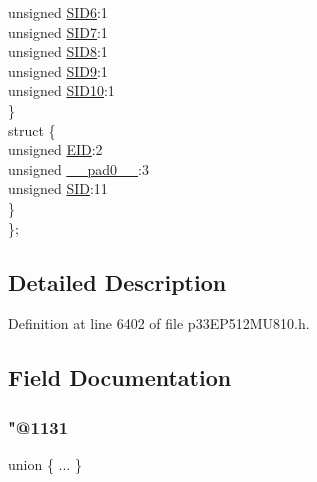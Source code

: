 \begin{DoxyCompactItemize}
\begin{tabbing}
\>\>unsigned \hyperlink{structtag_c2_r_x_f4_s_i_d_b_i_t_s_a70d70952133eb2389d5c326f9f0e8035}{SID6}:1\\
\>\>unsigned \hyperlink{structtag_c2_r_x_f4_s_i_d_b_i_t_s_a34097fb76decd431701fa2d86a22328e}{SID7}:1\\
\>\>unsigned \hyperlink{structtag_c2_r_x_f4_s_i_d_b_i_t_s_afe74894633244fdb0b0c01b4e8c522e7}{SID8}:1\\
\>\>unsigned \hyperlink{structtag_c2_r_x_f4_s_i_d_b_i_t_s_a33587704948067005c2a6a3ccc503c99}{SID9}:1\\
\>\>unsigned \hyperlink{structtag_c2_r_x_f4_s_i_d_b_i_t_s_a1a9084031c7f5fb16007feeebf0d8216}{SID10}:1\\
\>\} \\
\>struct \{\\
\>\>unsigned \hyperlink{structtag_c2_r_x_f4_s_i_d_b_i_t_s_ae80b378c9141f7c03e0b4e55b5f4b54d}{EID}:2\\
\>\>unsigned \hyperlink{structtag_c2_r_x_f4_s_i_d_b_i_t_s_adf71f3d8410c1f1dbbc96680a92c49af}{\_\_pad0\_\_}:3\\
\>\>unsigned \hyperlink{structtag_c2_r_x_f4_s_i_d_b_i_t_s_af88edf93b2fee2432665bd84f51287e4}{SID}:11\\
\>\} \\
\}; \\

\end{tabbing}\end{DoxyCompactItemize}


\subsection{Detailed Description}


Definition at line 6402 of file p33\+E\+P512\+M\+U810.\+h.



\subsection{Field Documentation}
\mbox{\label{structtag_c2_r_x_f4_s_i_d_b_i_t_s_a6a63563761a90c50aaed4fa2d6a45140}} 
\subsubsection{\texorpdfstring{"@1131}{@1131}}
{\footnotesize\ttfamily union \{ ... \} }

\mbox{\label{structtag_c2_r_x_f4_s_i_d_b_i_t_s_adf71f3d8410c1f1dbbc96680a92c49af}} 
